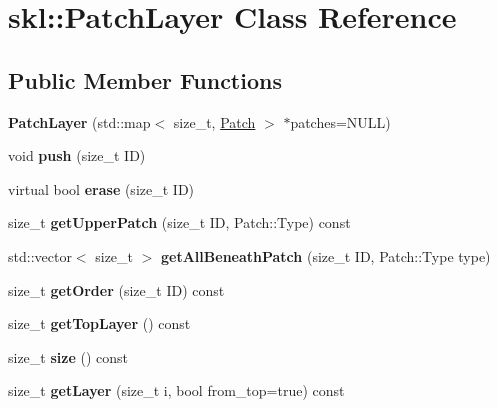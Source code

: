 \hypertarget{classskl_1_1_patch_layer}{}\section{skl\+:\+:Patch\+Layer Class Reference}
\label{classskl_1_1_patch_layer}
\subsection*{Public Member Functions}
\begin{DoxyCompactItemize}
\item 
\hypertarget{classskl_1_1_patch_layer_a77447ce905d028d0b0e4c0313a01c2ef}{}\label{classskl_1_1_patch_layer_a77447ce905d028d0b0e4c0313a01c2ef} 
{\bfseries Patch\+Layer} (std\+::map$<$ size\+\_\+t, \hyperlink{classskl_1_1_patch}{Patch} $>$ $\ast$patches=N\+U\+LL)
\item 
\hypertarget{classskl_1_1_patch_layer_ae222dc95783058d764c42061551a2471}{}\label{classskl_1_1_patch_layer_ae222dc95783058d764c42061551a2471} 
void {\bfseries push} (size\+\_\+t ID)
\item 
\hypertarget{classskl_1_1_patch_layer_ac0115e794b79083a88db1c09a2f022c8}{}\label{classskl_1_1_patch_layer_ac0115e794b79083a88db1c09a2f022c8} 
virtual bool {\bfseries erase} (size\+\_\+t ID)
\item 
\hypertarget{classskl_1_1_patch_layer_a6b8723ec9960e8c5643d267c27429cbf}{}\label{classskl_1_1_patch_layer_a6b8723ec9960e8c5643d267c27429cbf} 
size\+\_\+t {\bfseries get\+Upper\+Patch} (size\+\_\+t ID, Patch\+::\+Type) const
\item 
\hypertarget{classskl_1_1_patch_layer_a0c96a6ff8ede69f3868794c0f6da58c3}{}\label{classskl_1_1_patch_layer_a0c96a6ff8ede69f3868794c0f6da58c3} 
std\+::vector$<$ size\+\_\+t $>$ {\bfseries get\+All\+Beneath\+Patch} (size\+\_\+t ID, Patch\+::\+Type type)
\item 
\hypertarget{classskl_1_1_patch_layer_ab00a1d873e26d5e5eb784fe7b9ea5e43}{}\label{classskl_1_1_patch_layer_ab00a1d873e26d5e5eb784fe7b9ea5e43} 
size\+\_\+t {\bfseries get\+Order} (size\+\_\+t ID) const
\item 
\hypertarget{classskl_1_1_patch_layer_ada45e01006d75ebf73e90fbe7cbcc18b}{}\label{classskl_1_1_patch_layer_ada45e01006d75ebf73e90fbe7cbcc18b} 
size\+\_\+t {\bfseries get\+Top\+Layer} () const
\item 
\hypertarget{classskl_1_1_patch_layer_a6cb7a4626327f3cacffc87a304f0c9a3}{}\label{classskl_1_1_patch_layer_a6cb7a4626327f3cacffc87a304f0c9a3} 
size\+\_\+t {\bfseries size} () const
\item 
\hypertarget{classskl_1_1_patch_layer_a91e45cfce7cab4c8043282d2efc01a9f}{}\label{classskl_1_1_patch_layer_a91e45cfce7cab4c8043282d2efc01a9f} 
size\+\_\+t {\bfseries get\+Layer} (size\+\_\+t i, bool from\+\_\+top=true) const
\end{DoxyCompactItemize}
